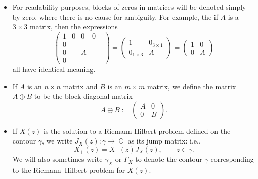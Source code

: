 \documentclass[10pt,a4paper]{amsart}
\DeclareMathOperator{\CC}{\mathbb{C}}
\numberwithin{equation}{section}
\begin{document}
\begin{itemize}
\begin{equation*}
 \end{equation*}
 The matrix $\hat{\sigma}_{ij}$ permutes the $i^{\rm th}$ and $j^{\rm th}$ row and column of a given matrix $A$ by conjugation; again using our example of $\hat{\sigma}_{24}$,
 \begin{equation*}
 \hat{\sigma}_{24} A \hat{\sigma}_{24} =
 \hat{\sigma}_{24}\begin{pmatrix}
 a_{11} & a_{12} & a_{13} & a_{14}\\
 a_{21} & a_{22} & a_{23} & a_{24}\\
 a_{31} & a_{32} & a_{33} & a_{34}\\
 a_{41} & a_{42} & a_{43} & a_{44}
 \end{pmatrix}\hat{\sigma}_{24}
 = \begin{pmatrix}
 a_{11} & a_{14} & a_{13} & a_{12}\\
 a_{41} & a_{44} & a_{43} & a_{42}\\
 a_{31} & a_{34} & a_{33} & a_{32}\\
 a_{21} & a_{24} & a_{23} & a_{22}
 \end{pmatrix}.
 \end{equation*}
 \item For readability purposes, blocks of zeros in matrices will be denoted simply by zero, where there is no cause for ambiguity. For example, the if $A$ is a $3\times 3$ matrix, then the expressions
 \begin{equation*}
 \begin{pmatrix}
 1 & 0 & 0 & 0\\
 0 & & & & \\
 0 & & A & \\
 0 & & &
 \end{pmatrix}=
 \begin{pmatrix}
 1 & 0_{3\times 1}\\
 0_{1\times 3} & A
 \end{pmatrix}=
 \begin{pmatrix}
 1 & 0 \\
 0 & A
 \end{pmatrix}
 \end{equation*}
 all have identical meaning.
 \item If $A$ is an $n\times n$ matrix and $B$ is an $m\times m$ matrix, we define the matrix $A\oplus B$ to be the block diagonal matrix
 \begin{equation*}
 A\oplus B :=
 \begin{pmatrix}
 A & 0\\
 0 & B
 \end{pmatrix}.
 \end{equation*}
 \item If $X(z)$ is the solution to a Riemann Hilbert problem defined on the contour $\gamma$, we write $J_X(z)\colon \gamma \to \CC$ as its jump matrix: i.e.,
 \begin{equation*}
 X_+(z) = X_-(z) J_X(z), \qquad z\in \gamma.
 \end{equation*}
 We will also sometimes write $\gamma_X$ or $\Gamma_X$ to denote the contour $\gamma$ corresponding to the Riemann--Hilbert problem for $X(z)$.
 \end{itemize}
\end{document}

